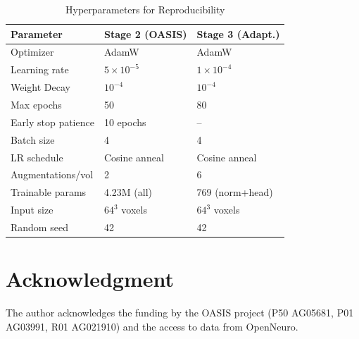 \documentclass[12pt,a4paper]{article}
\begin{document}
\begin{table}[!h]
\caption{Hyperparameters for Reproducibility}
\label{tab:hyper}
\centering
\setlength{\tabcolsep}{6pt}
\begin{tabular}{lll}
\toprule
Parameter & Stage 2 (OASIS) & Stage 3 (Adapt.) \\
\midrule
Optimizer           & AdamW            & AdamW \\
Learning rate       & $5\times10^{-5}$ & $1\times10^{-4}$ \\
Weight Decay        & $10^{-4}$        & $10^{-4}$ \\
Max epochs          & 50               & 80 \\
Early stop patience & 10 epochs        & -- \\
Batch size          & 4                & 4 \\
LR schedule         & Cosine anneal    & Cosine anneal \\
Augmentations/vol   & 2                & 6 \\
Trainable params    & 4.23M (all)      & 769 (norm+head) \\
Input size          & $64^3$ voxels    & $64^3$ voxels \\
Random seed         & 42               & 42 \\
\bottomrule
\end{tabular}
\end{table}

\section*{Acknowledgment}

The author acknowledges the funding by the OASIS project
(P50 AG05681, P01 AG03991, R01 AG021910) and the access to data from
OpenNeuro.
\end{document}
